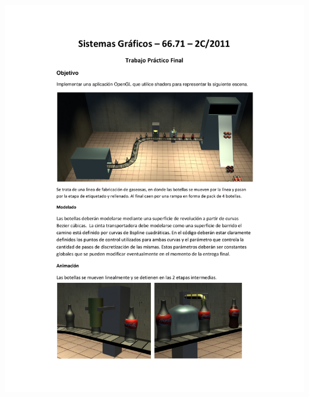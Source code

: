 \documentclass[11pt]{article}
\begin{document}
\begin{center}
\includegraphics[trim = 25mm 30mm 10mm 35mm, clip,height=0.93\textheight,width=1.04\textwidth]{tpfinal-c2-2011.pdf}

\end{center}
\end{document}
